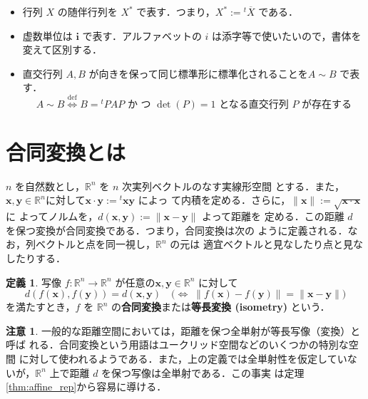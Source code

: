 \documentclass[11pt, uplatex, dvipdfmx, titlepage]{jsarticle}
\renewcommand{\i}{\mathbf{i}}
\renewcommand{\bar}[1]{\overline{#1}}
\theoremstyle{definition}
\newtheorem*{definition}{定義}
\newtheorem*{remark}{注意}
\begin{document}
\begin{itemize}
\item 行列 $X$ の随伴行列を $X^*$ で表す．つまり，$X^* := {}^{t}\bar{X}$ である．  
  
\item 虚数単位は $\i$ で表す．アルファベットの $i$ は添字等で使いたいので，書体を変えて区別する．

  
\item 直交行列 $A,B$ が向きを保って同じ標準形に標準化されることを$ A \sim B$ で表す．
  \[
    A \sim B \overset{\textrm{def}}{\Longleftrightarrow} B= {}^{t}PAP \text{ か
      つ } \det(P) =1 \text{ となる直交行列 $P$ が存在する}
  \]

  
  
\end{itemize}

\newpage


\section{合同変換とは}\label{sec:whatis}

$n$ を自然数とし，$\mathbb{R}^n$ を $n$ 次実列ベクトルのなす実線形空間
とする．また，$\bm{x}, \bm{y} \in
\mathbb{R}^n$に対して$\bm{x} \cdot \bm{y} := {}^{t}\bm{x} \bm{y}$ によっ
て内積を定める．さらに，$\| \bm{x}\| := \sqrt{\bm{x} \cdot \bm{x}}$ に
よってノルムを，$d(\bm{x}, \bm{y}) :=\|\bm{x} - \bm{y} \|$ よって距離を
定める．この距離 $d$ を保つ変換が合同変換である．つまり，合同変換は次の
ように定義される．なお，列ベクトルと点を同一視し，$\mathbb{R}^n$ の元は
適宜ベクトルと見なしたり点と見なしたりする．


\begin{definition}
  写像 $f:\mathbb{R}^n \to \mathbb{R}^n$
  が任意の$\bm{x}, \bm{y} \in \mathbb{R}^n$ に対して
  \[
    d(f(\bm{x}), f(\bm{y})) = d (\bm{x}, \bm{y}) \quad
    \Big( \Longleftrightarrow \;\|f(\bm{x}) - f(\bm{y})\| = \|\bm{x} - \bm{y}\| \Big)
  \]
  を満たすとき，$f$ を $\mathbb{R}^n$ の\textbf{合同変換}または\textbf{等長変換 (isometry)} という．
\end{definition}

\begin{remark}
  一般的な距離空間においては，距離を保つ全単射が等長写像（変換）と呼ば
  れる．合同変換という用語はユークリッド空間などのいくつかの特別な空間
  に対して使われるようである．また，上の定義では全単射性を仮定していな
  いが，$\mathbb{R}^n$ 上で距離 $d$ を保つ写像は全単射である．この事実
  は定理\ref{thm:affine_rep}から容易に導ける．
\end{remark}
\end{document}
